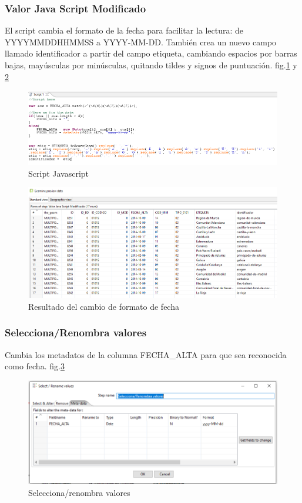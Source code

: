 \subsubsection{Valor Java Script Modificado}
El script cambia el formato de la fecha para facilitar la lectura: de YYYYMMDDHHMMSS a YYYY-MM-DD. También
crea un nuevo campo llamado identificador a partir del campo etiqueta, cambiando espacios por barras bajas, mayúsculas
por minúsculas, quitando tildes y signos de puntuación. fig.\ref{fig:script} y \ref{fig:fecha}

\begin{figure}[H]
    \includegraphics[width=\textwidth]{images/script.png}
    \centering
    \caption{Script Javascript}
    \label{fig:script}
\end{figure}

\begin{figure}[H]
    \includegraphics[width=\textwidth]{images/fecha.png}
    \centering
    \caption{Resultado del cambio de formato de fecha}
    \label{fig:fecha}
\end{figure}

\subsubsection{Selecciona/Renombra valores}
Cambia los metadatos de la columna FECHA\_ALTA para que sea reconocida como fecha. fig.\ref{fig:selecciona-renombra}

\begin{figure}[H]
    \includegraphics[width=\textwidth]{images/selecciona-renombra.png}
    \centering
    \caption{Selecciona/renombra valores}
    \label{fig:selecciona-renombra}
\end{figure}

